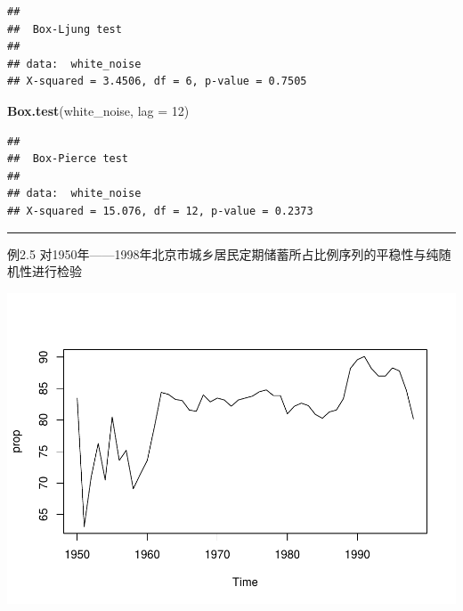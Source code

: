 \documentclass[]{article}
\newenvironment{Shaded}{\begin{snugshade}}{\end{snugshade}}
\newcommand{\DataTypeTok}[1]{\textcolor[rgb]{0.13,0.29,0.53}{#1}}
\newcommand{\DecValTok}[1]{\textcolor[rgb]{0.00,0.00,0.81}{#1}}
\newcommand{\KeywordTok}[1]{\textcolor[rgb]{0.13,0.29,0.53}{\textbf{#1}}}
\newcommand{\NormalTok}[1]{#1}
\newcommand{\OperatorTok}[1]{\textcolor[rgb]{0.81,0.36,0.00}{\textbf{#1}}}
\newcommand{\StringTok}[1]{\textcolor[rgb]{0.31,0.60,0.02}{#1}}
\begin{document}
\begin{verbatim}
## 
##  Box-Ljung test
## 
## data:  white_noise
## X-squared = 3.4506, df = 6, p-value = 0.7505
\end{verbatim}

\begin{Shaded}
\begin{Highlighting}[]
\KeywordTok{Box.test}\NormalTok{(white_noise, }\DataTypeTok{lag =} \DecValTok{12}\NormalTok{)}
\end{Highlighting}
\end{Shaded}

\begin{verbatim}
## 
##  Box-Pierce test
## 
## data:  white_noise
## X-squared = 15.076, df = 12, p-value = 0.2373
\end{verbatim}

\begin{center}\rule{0.5\linewidth}{\linethickness}\end{center}

例2.5
对1950年------1998年北京市城乡居民定期储蓄所占比例序列的平稳性与纯随机性进行检验

\begin{Shaded}
\end{Shaded}

\includegraphics{timeseries_files/figure-latex/ex2.5-1.pdf}
\end{document}
